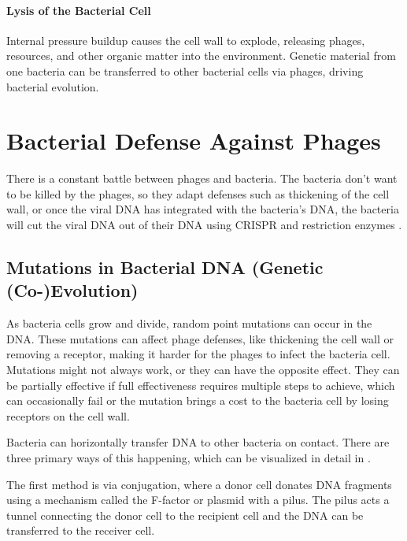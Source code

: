 \paragraph{Lysis of the Bacterial Cell}
Internal pressure buildup causes the cell wall to explode, releasing phages, resources, and other organic matter into the environment. 
Genetic material from one bacteria can be transferred to other bacterial cells via phages, driving bacterial evolution.  %


\section{Bacterial Defense Against Phages} 
There is a constant battle between phages and bacteria. 
The bacteria don't want to be killed by the phages, so they adapt defenses such as thickening of the cell wall, or once the viral DNA has integrated with the bacteria's DNA, the bacteria will cut the viral DNA out of their DNA using CRISPR and restriction enzymes \cite{iglerPhenotypicFluxRole2022}. 

\subsection{Mutations in Bacterial DNA (Genetic (Co-)Evolution)}
As bacteria cells grow and divide, random point mutations can occur in the DNA. 
These mutations can affect phage defenses, like thickening the cell wall or removing a receptor, making it harder for the phages to infect the bacteria cell. 
Mutations might not always work, or they can have the opposite effect. 
They can be partially effective if full effectiveness requires multiple steps to achieve, which can occasionally fail \cite{lenskiTWOSTEPRESISTANCEESCHERICHIA1984} or the mutation brings a cost to the bacteria cell by losing receptors on the cell wall. \newline

Bacteria can horizontally transfer DNA to other bacteria on contact. 
There are three primary ways of this happening, which can be visualized in detail in . 

The first method is via conjugation, where a donor cell donates DNA fragments using a mechanism called the F-factor or plasmid with a pilus. 
The pilus acts a tunnel connecting the donor cell to the recipient cell and the DNA can be transferred to the receiver cell. 

